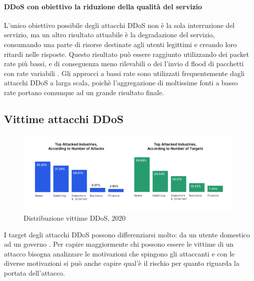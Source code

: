 \paragraph{DDoS con obiettivo la riduzione della qualità del servizio}


L'unico obiettivo possibile degli attacchi DDoS non è la sola interruzione del servizio, ma un altro risultato attuabile è la degradazione del servizio, consumando una parte di risorse destinate agli utenti legittimi e creando loro ritardi nelle risposte. Questo risultato può essere raggiunto utilizzando dei packet rate più bassi, e di conseguenza meno rilevabili o dei l'invio d flood di pacchetti con rate variabili \cite{ddos_survey_3, ddos_survey_4}.
Gli approcci a bassi rate sono utilizzati frequentemente dagli attacchi DDoS a larga scala, poichè l'aggregazione di moltissime fonti a basso rate portano comunque ad un grande risultato finale.

\subsection{Vittime attacchi DDoS}

\begin{figure}[h]
    \includegraphics[width=\hsize]{images/introduzione/bersagli_ddos.png}
    \caption{Distribuzione vittime DDoS, 2020 \cite{imperva_ddos_report}}
    \centering
\end{figure}

I target degli attacchi DDoS possono differenziarsi molto: da un utente domestico ad un governo \cite{ddos_motivations}. Per capire maggiormente chi possono essere le vittime di un attacco bisogna analizzare le motivazioni che spingono gli attaccanti e con le diverse motivazioni si può anche capire qual'è il rischio per quanto riguarda la portata dell'attacco. 

